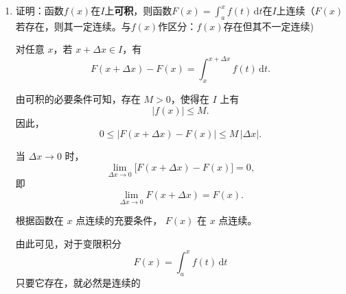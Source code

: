 \documentclass[a4paper,12pt]{article}
\begin{document}
\begin{enumerate}
\begin{analysisbox}[证]
            由连续函数的局部保号性知，
            存在 $\delta>0$ 与 $\eta>0$，
            使得当
            \[
                x\in[x_0-\delta,\;x_0+\delta]\subset[a,b]
            \]
            时，恒有
            \[
                f(x)\ge \eta>0.
            \]

            根据定积分的不等式性质，有
            \[
                \int_a^b f(x)\,dx
                \ge
                \int_{x_0-\delta}^{x_0+\delta} f(x)\,dx
                \ge
                \int_{x_0-\delta}^{x_0+\delta} \eta\,dx
                =
                2\delta\eta
                >0.
            \]
        \end{analysisbox}
        \item 证明：函数$f(x)$在$I$上\textbf{可积}，则函数$F(x) = \int_a^x f(t)\,\mathrm{d}t$在$I$上连续（$F(x)$若存在，则其一定连续。与$f(x)$作区分：$f(x)$存在但其不一定连续)
        \begin{analysisbox}[证]
            对任意 $x$，若 $x+\Delta x \in I$，有
            \[
                F(x+\Delta x)-F(x)
                =
                \int_x^{x+\Delta x} f(t)\,\mathrm{d}t.
            \]

            由可积的必要条件可知，存在 $M>0$，使得在 $I$ 上有
            \[
                |f(x)| \le M.
            \]
            因此，
            \[
                0 \le \bigl| F(x+\Delta x)-F(x) \bigr|
                \le
                M\,|\Delta x|.
            \]

            当 $\Delta x \to 0$ 时，
            \[
                \lim_{\Delta x \to 0}
                \bigl[ F(x+\Delta x)-F(x) \bigr]
                =
                0,
            \]
            即
            \[
                \lim_{\Delta x \to 0} F(x+\Delta x) = F(x).
            \]

            根据函数在 $x$ 点连续的充要条件，
            $F(x)$ 在 $x$ 点连续。

            由此可见，对于变限积分
            \[
                F(x)=\int_a^x f(t)\,\mathrm{d}t
            \]
            只要它存在，就必然是连续的
        \end{analysisbox}
    \end{enumerate}
\end{document}
